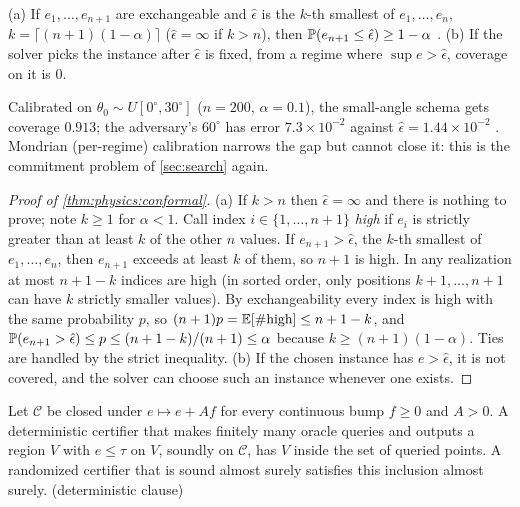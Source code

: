 \begin{theorem}\label{thm:physics:conformal}
(a) If $e_1,\dots,e_{n+1}$ are exchangeable and $\hat\epsilon$ is the $k$-th smallest of
$e_1,\dots,e_n$, $k=\lceil(n+1)(1-\alpha)\rceil$ ($\hat\epsilon=\infty$ if $k>n$), then
$\mathbb{P}(e_{n+1}\le\hat\epsilon)\ge1-\alpha$ \citep{vovk2005algorithmic,lei2018distribution}. (b) If the solver picks the instance after
$\hat\epsilon$ is fixed, from a regime where $\sup e>\hat\epsilon$, coverage on it is $0$.
\end{theorem}

Calibrated on $\theta_0\sim U[0^\circ,30^\circ]$ ($n=200$, $\alpha=0.1$), the small-angle schema
gets coverage $0.913$; the adversary's $60^\circ$ has error $7.3\times10^{-2}$ against
$\hat\epsilon=1.44\times10^{-2}$ . Mondrian (per-regime) calibration narrows
the gap but cannot close it: this is the commitment problem of \cref{sec:search} again.

\begin{proof}[Proof of \cref{thm:physics:conformal}]
(a) If $k>n$ then $\hat\epsilon=\infty$ and there is nothing to prove; note $k\ge1$ for
$\alpha<1$. Call index $i\in\{1,\dots,n+1\}$ \emph{high} if $e_i$ is strictly greater than at
least $k$ of the other $n$ values. If $e_{n+1}>\hat\epsilon$, the $k$-th smallest of
$e_1,\dots,e_n$, then $e_{n+1}$ exceeds at least $k$ of them, so $n+1$ is high. In any
realization at most $n+1-k$ indices are high (in sorted order, only positions $k+1,\dots,n+1$
can have $k$ strictly smaller values). By exchangeability every index is high with the same
probability $p$, so $(n+1)p=\mathbb{E}[\#\text{high}]\le n+1-k$, and
$\mathbb{P}(e_{n+1}>\hat\epsilon)\le p\le(n+1-k)/(n+1)\le\alpha$ because $k\ge(n+1)(1-\alpha)$.
Ties are handled by the strict inequality. (b) If the chosen instance has $e>\hat\epsilon$,
it is not covered, and the solver can choose such an instance whenever one exists.
\end{proof}

\begin{theorem}\label{thm:physics:noreg}
Let $\mathcal C$ be closed under $e\mapsto e+Af$ for every continuous bump $f\ge0$ and $A>0$.
A deterministic certifier that makes finitely many oracle queries and outputs a region $V$
with $e\le\tau$ on $V$, soundly on $\mathcal C$, has $V$ inside the set of queried points. A
randomized certifier that is sound almost surely satisfies this inclusion almost surely.
\hfill{} (deterministic clause)
\end{theorem}

